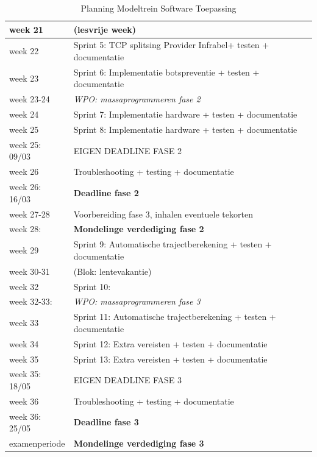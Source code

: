 \documentclass[a4paper, 11pt]{article}
\newcommand{\<}{\scriptsize\textless\normalsize}
\renewcommand{\>}{\scriptsize\textgreater\normalsize}
\begin{document}
\begin{table}[H]
\begin{center}
\begin{tabular}{|l l|}
			week 21 & (lesvrije week)\\
			\hline
			\hline
			week 22 & Sprint 5: TCP splitsing Provider Infrabel+ testen + documentatie\\
			week 23 & Sprint 6: Implementatie botspreventie + testen + documentatie\\
			week 23-24 & \emph{WPO: massaprogrammeren fase 2}\\
			week 24 & Sprint 7: Implementatie hardware + testen + documentatie\\
			week 25 & Sprint 8: Implementatie hardware + testen + documentatie\\
			\hline
			week 25: 09/03 & EIGEN DEADLINE FASE 2\\
			week 26  & Troubleshooting + testing + documentatie\\
			week 26: 16/03 & \textbf{Deadline fase 2}\\
			week 27-28 & Voorbereiding fase 3, inhalen eventuele tekorten\\
			week 28: & \textbf{Mondelinge verdediging fase 2}\\
			\hline
			week 29 & Sprint 9: Automatische trajectberekening + testen + documentatie\\
			week 30-31 & (Blok: lentevakantie)\\
			week 32 & Sprint 10: \\
			week 32-33: & \emph{WPO: massaprogrammeren fase 3}\\
			week 33 & Sprint 11: Automatische trajectberekening + testen + documentatie\\
			week 34 & Sprint 12: Extra vereisten + testen + documentatie\\
			week 35 & Sprint 13: Extra vereisten + testen + documentatie\\
			\hline
			week 35: 18/05 & EIGEN DEADLINE FASE 3\\
			week 36 & Troubleshooting + testing + documentatie\\
			week 36: 25/05 & \textbf{Deadline fase 3}\\
			examenperiode & \textbf{Mondelinge verdediging fase 3}\\
			\hline
		\end{tabular}
		\caption{Planning Modeltrein Software Toepassing}
	\end{center}
\end{table}

\label{lastpage}
\end{document}
